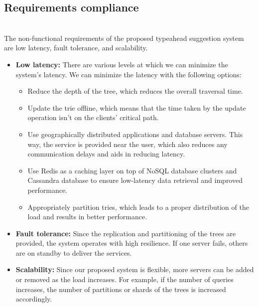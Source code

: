 

\subsection{Requirements compliance}\label{MQypNT8H9uVEDRNoSTQmr}
\\
The non-functional requirements of the proposed typeahead suggestion system are low latency, fault tolerance, and scalability.

\begin{itemize}
\item
\protect{}\label{kxAqZJuVqO8N2nyxxrz1c}
\textbf{Low latency:} There are various levels at which we can minimize the system's latency. We can minimize the latency with the following options:

\begin{itemize}
\item
Reduce the depth of the tree, which reduces the overall traversal time.
\item
Update the trie offline, which means that the time taken by the update operation isn't on the clients' critical path.
\item
Use geographically distributed applications and database servers. This way, the service is provided near the user, which also reduces any communication delays and aids in reducing latency.
\item
Use Redis as a caching layer on top of NoSQL database clusters and Cassandra database to ensure low-latency data retrieval and improved performance.
\item
Appropriately partition tries, which leads to a proper distribution of the load and results in better performance.
\end{itemize}
\item
\protect{}\label{jHGBEhKx6C_OSvxJgtr-a}
\textbf{Fault tolerance:} Since the replication and partitioning of the trees are provided, the system operates with high resilience. If one server fails, others are on standby to deliver the services.
\item
\protect{}\label{BCR9Hri_I-h1uMOFjiJlh}
\textbf{Scalability:} Since our proposed system is flexible, more servers can be added or removed as the load increases. For example, if the number of queries increases, the number of partitions or shards of the trees is increased accordingly.
\end{itemize}


